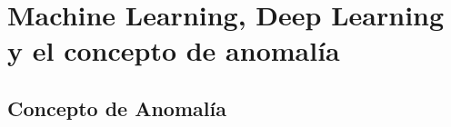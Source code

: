 \part{Machine Learning, Deep Learning y el concepto de anomalía}
\label{part:machine_learning_deep_learning_anomalia}

\chapter{Concepto de Anomalía}
\label{chapter:anomalia}